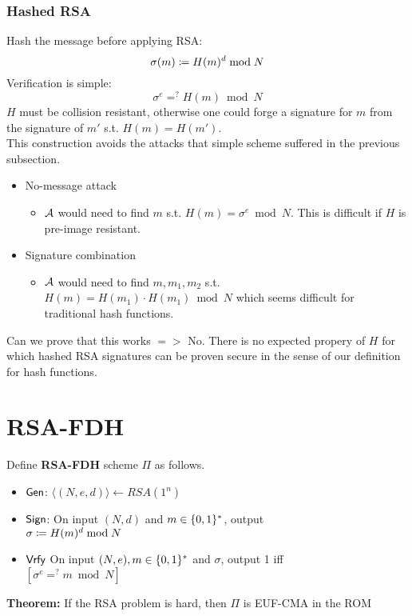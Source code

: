 \documentclass[12pt]{article}
\begin{document}
\subsubsection{Hashed RSA}
Hash the message before applying RSA:
\begin{equation*}
	\sigma(m) \coloneqq H(m)^d \bmod{N}
\end{equation*}
Verification is simple:
\begin{equation*}
	\sigma^e =^? H(m) \bmod{N}
\end{equation*}
$H$ must be collision resistant, otherwise one could forge a signature for $m$ from the signature of $m'$ s.t. $H(m)=H(m')$.\\
This construction avoids the attacks that simple scheme suffered in the previous subsection.
\begin{itemize}
	\item No-message attack
	\begin{itemize}
		\item $\mathcal{A}$ would need to find $m$ s.t. $H(m) = \sigma^e \bmod{N}$. This is difficult if $H$ is pre-image resistant.
	\end{itemize}
	\item Signature combination
	\begin{itemize}
		\item $\mathcal{A}$ would need to find $m,m_1,m_2$ s.t.\\
		$H(m) = H(m_1)\cdot H(m_1)\bmod{N} $ which seems difficult for traditional hash functions.
	\end{itemize}	
\end{itemize}
Can we prove that this works $=>$ No. There is no expected propery of $H$ for which hashed RSA signatures can be proven secure in the sense of our definition for hash functions.
\newpage


\section{RSA-FDH}
Define \textbf{RSA-FDH} scheme $\Pi$ as follows.
\begin{itemize}
	\item $\operatorname{\mathsf{Gen}}$:  $\langle (N,e,d)\rangle \leftarrow RSA(1^n)$
	\item $\operatorname{\mathsf{Sign}}$: On input $(N,d)$ and $m\in \{0, 1\}^*$, output\\
	$\sigma \coloneqq H(m)^d \bmod{N}$
	\item $\operatorname{\mathsf{Vrfy}}$ On input $(N,e),m \in \{0, 1\}^*$ and $\sigma$, output 1 iff\\  $[\sigma^e =^? m \bmod{N}]$
\end{itemize}
\textbf{Theorem:} If the RSA problem is hard, then $\Pi$ is EUF-CMA in the ROM
\end{document}
